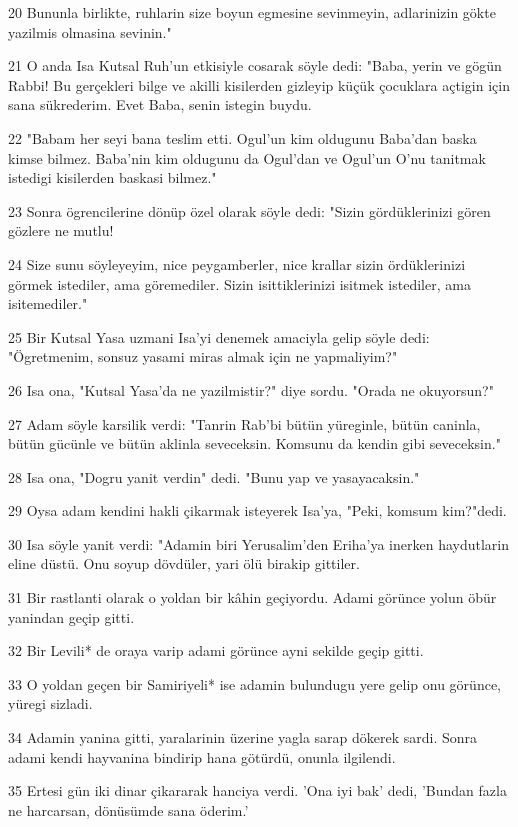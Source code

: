 \par 20 Bununla birlikte, ruhlarin size boyun egmesine sevinmeyin, adlarinizin gökte yazilmis olmasina sevinin."
\par 21 O anda Isa Kutsal Ruh'un etkisiyle cosarak söyle dedi: "Baba, yerin ve gögün Rabbi! Bu gerçekleri bilge ve akilli kisilerden gizleyip küçük çocuklara açtigin için sana sükrederim. Evet Baba, senin istegin buydu.
\par 22 "Babam her seyi bana teslim etti. Ogul'un kim oldugunu Baba'dan baska kimse bilmez. Baba'nin kim oldugunu da Ogul'dan ve Ogul'un O'nu tanitmak istedigi kisilerden baskasi bilmez."
\par 23 Sonra ögrencilerine dönüp özel olarak söyle dedi: "Sizin gördüklerinizi gören gözlere ne mutlu!
\par 24 Size sunu söyleyeyim, nice peygamberler, nice krallar sizin ördüklerinizi görmek istediler, ama göremediler. Sizin isittiklerinizi isitmek istediler, ama isitemediler."
\par 25 Bir Kutsal Yasa uzmani Isa'yi denemek amaciyla gelip söyle dedi: "Ögretmenim, sonsuz yasami miras almak için ne yapmaliyim?"
\par 26 Isa ona, "Kutsal Yasa'da ne yazilmistir?" diye sordu. "Orada ne okuyorsun?"
\par 27 Adam söyle karsilik verdi: "Tanrin Rab'bi bütün yüreginle, bütün caninla, bütün gücünle ve bütün aklinla seveceksin. Komsunu da kendin gibi seveceksin."
\par 28 Isa ona, "Dogru yanit verdin" dedi. "Bunu yap ve yasayacaksin."
\par 29 Oysa adam kendini hakli çikarmak isteyerek Isa'ya, "Peki, komsum kim?"dedi.
\par 30 Isa söyle yanit verdi: "Adamin biri Yerusalim'den Eriha'ya inerken haydutlarin eline düstü. Onu soyup dövdüler, yari ölü birakip gittiler.
\par 31 Bir rastlanti olarak o yoldan bir kâhin geçiyordu. Adami görünce yolun öbür yanindan geçip gitti.
\par 32 Bir Levili* de oraya varip adami görünce ayni sekilde geçip gitti.
\par 33 O yoldan geçen bir Samiriyeli* ise adamin bulundugu yere gelip onu görünce, yüregi sizladi.
\par 34 Adamin yanina gitti, yaralarinin üzerine yagla sarap dökerek sardi. Sonra adami kendi hayvanina bindirip hana götürdü, onunla ilgilendi.
\par 35 Ertesi gün iki dinar çikararak hanciya verdi. 'Ona iyi bak' dedi, 'Bundan fazla ne harcarsan, dönüsümde sana öderim.'
